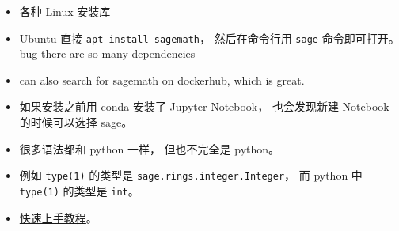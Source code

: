 
\begin{issues}
\issueDraft
\end{issues}

\begin{itemize}
\item \href{https://repology.org/project/sagemath/versions}{各种 Linux 安装库}
\item Ubuntu 直接 \verb`apt install sagemath`， 然后在命令行用 \verb`sage` 命令即可打开。 bug there are so many dependencies
\item can also search for sagemath on dockerhub, which is great.
\item 如果安装之前用 conda 安装了 Jupyter Notebook， 也会发现新建 Notebook 的时候可以选择 sage。
\item 很多语法都和 python 一样， 但也不完全是 python。
\item 例如 \verb`type(1)` 的类型是 \verb`sage.rings.integer.Integer`， 而 python 中 \verb`type(1)` 的类型是 \verb`int`。
\item \href{https://www.sagemath.org/tour-quickstart.html}{快速上手教程}。
\end{itemize}
